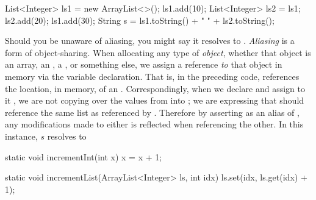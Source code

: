 \begin{verbnobox}[\small]
List<Integer> ls1 = new ArrayList<>();
ls1.add(10);
List<Integer> ls2 = ls1;
ls2.add(20);
ls1.add(30);
String s = ls1.toString() + " " + ls2.toString();
\end{verbnobox}
Should you be unaware of aliasing, you might say it resolves to . \textit{Aliasing} is a form of object-sharing. When allocating any type of \textit{object}, whether that object is an array, an , a , or something else, we assign a reference \textit{to} that object in memory via the variable declaration. That is, in the preceding code,  references the location, in memory, of an . Correspondingly, when we declare  and assign to it , we are not copying over the values from  into ; we are expressing that  should reference the same list as referenced by . Therefore by asserting  as an alias of , any modifications made to either is reflected when referencing the other. In this instance, $s$ resolves to 


\begin{verbnobox}[\small]
static void incrementInt(int x) {
  x = x + 1;
}

static void incrementList(ArrayList<Integer> ls, int idx) {
  ls.set(idx, ls.get(idx) + 1);
}
\end{verbnobox}


